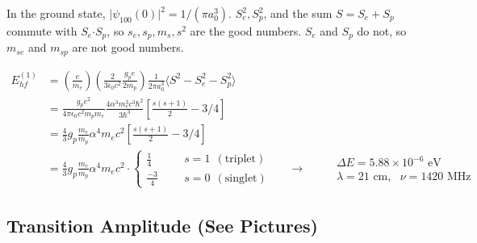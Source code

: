 \documentclass[12pt]{article}
\newcommand*{\dotP}{\boldsymbol \cdot}	%
\begin{document}
\vspace{20pt} \noindent
In the ground state, \(\big| \psi_{100}(0) \big|^2 = 1/(\pi a_0^3)\). \(S_e^2, S_p^2\), and the 
sum \(S=S_e + S_p\) commute with \(S_e \dotP S_p\), so \(s_e, s_p, m_s, s^2\) are the good numbers.
\(S_e\) and \(S_p\) do not, so \(m_{se}\) and \(m_{sp}\) are not good numbers.

\vspace{20pt}
\(\begin{aligned}
    E^{(1)}_{hf} &= \left(\frac{e}{m_e} \right) \left( \frac{2}{3\epsilon_0 c^2} \frac{g_p e}{2m_p} \right) 
        \frac{1}{2 \pi a_0^3} \langle S^2 - S^2_e - S^2_p \rangle \\[5pt]
    &= \frac{g_p e^2}{4 \pi \epsilon_0 c^2 m_p m_e} 
        \frac{4 \alpha^3 m_e^3 c^3 \hbar^2 }{3 \hbar^3} \left[ \frac{s(s+1)}{2} - 3/4 \right]\\[5pt]
    &= \frac{4}{3} g_p \frac{m_e}{m_p} \alpha^4 m_e c^2 \left[ \frac{s(s+1)}{2} - 3/4 \right]\\[5pt]
    &= \frac{4}{3} g_p \frac{m_e}{m_p} \alpha^4 m_e c^2 \cdot 
        \begin{cases}
            \frac{1}{4}     &   \hspace{18pt} s=1 \ \ (\text{triplet})\\
            \frac{-3}{4}    &   \hspace{18pt} s=0 \ \ (\text{singlet})
        \end{cases} \hspace{18pt} \rightarrow \hspace{18pt} \begin{aligned}
            &\Delta E = 5.88 \times 10^{-6} \text{\ eV} \\[5pt]
            &\lambda = 21 \text{\ cm}, \ \ \ \nu = 1420 \text{\ MHz}
        \end{aligned}
\end{aligned}\)

%
%
\newpage
\subsection{Transition Amplitude (See Pictures)}
\end{document}
